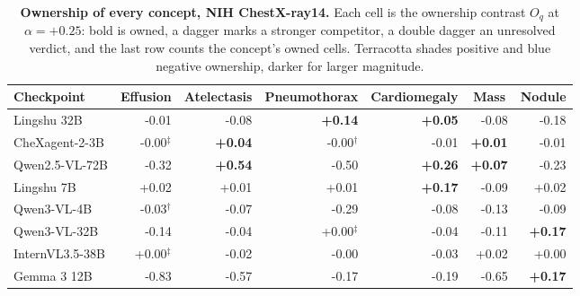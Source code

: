 \documentclass{article}
\begin{document}
\begin{table}[htbp]
\centering
\scriptsize
\setlength{\tabcolsep}{4pt}
\caption{\textbf{Ownership of every concept, NIH ChestX-ray14.} Each cell is the ownership contrast $O_q$ at $\alpha=+0.25$: bold is owned, a dagger marks a stronger competitor, a double dagger an unresolved verdict, and the last row counts the concept's owned cells. Terracotta shades positive and blue negative ownership, darker for larger magnitude.}
\label{tab:cf-own-nih}
\begin{tabular}{lrrrrrr}
\toprule
Checkpoint & \multicolumn{1}{c}{Effusion} & \multicolumn{1}{c}{Atelectasis} & \multicolumn{1}{c}{Pneumothorax} & \multicolumn{1}{c}{Cardiomegaly} & \multicolumn{1}{c}{Mass} & \multicolumn{1}{c}{Nodule}\\
\midrule
Lingshu 32B & \cellcolor{cfSlate1}-0.01 & \cellcolor{cfSlate2}-0.08 & \cellcolor{cfTerra3}\textbf{+0.14} & \cellcolor{cfTerra2}\textbf{+0.05} & \cellcolor{cfSlate2}-0.08 & \cellcolor{cfSlate3}-0.18 \\
CheXagent-2-3B & \cellcolor{cfSlate1}-0.00$^{\ddagger}$ & \cellcolor{cfTerra2}\textbf{+0.04} & \cellcolor{cfSlate1}-0.00$^{\dagger}$ & \cellcolor{cfSlate1}-0.01 & \cellcolor{cfTerra1}\textbf{+0.01} & \cellcolor{cfSlate1}-0.01 \\
Qwen2.5-VL-72B & \cellcolor{cfSlate4}-0.32 & \cellcolor{cfTerra4}\textbf{+0.54} & \cellcolor{cfSlate4}-0.50 & \cellcolor{cfTerra4}\textbf{+0.26} & \cellcolor{cfTerra2}\textbf{+0.07} & \cellcolor{cfSlate3}-0.23 \\
Lingshu 7B & \cellcolor{cfTerra1}+0.02 & \cellcolor{cfTerra1}+0.01 & \cellcolor{cfTerra1}+0.01 & \cellcolor{cfTerra3}\textbf{+0.17} & \cellcolor{cfSlate2}-0.09 & \cellcolor{cfTerra1}+0.02 \\
Qwen3-VL-4B & \cellcolor{cfSlate2}-0.03$^{\dagger}$ & \cellcolor{cfSlate2}-0.07 & \cellcolor{cfSlate4}-0.29 & \cellcolor{cfSlate2}-0.08 & \cellcolor{cfSlate3}-0.13 & \cellcolor{cfSlate2}-0.09 \\
Qwen3-VL-32B & \cellcolor{cfSlate3}-0.14 & \cellcolor{cfSlate2}-0.04 & \cellcolor{cfTerra1}+0.00$^{\ddagger}$ & \cellcolor{cfSlate2}-0.04 & \cellcolor{cfSlate3}-0.11 & \cellcolor{cfTerra3}\textbf{+0.17} \\
InternVL3.5-38B & \cellcolor{cfTerra1}+0.00$^{\ddagger}$ & \cellcolor{cfSlate1}-0.02 & \cellcolor{cfSlate1}-0.00 & \cellcolor{cfSlate2}-0.03 & \cellcolor{cfTerra1}+0.02 & \cellcolor{cfTerra1}+0.00 \\
Gemma 3 12B & \cellcolor{cfSlate4}-0.83 & \cellcolor{cfSlate4}-0.57 & \cellcolor{cfSlate3}-0.17 & \cellcolor{cfSlate3}-0.19 & \cellcolor{cfSlate4}-0.65 & \cellcolor{cfTerra3}\textbf{+0.17} \\

\end{tabular}
\end{table}
\end{document}
